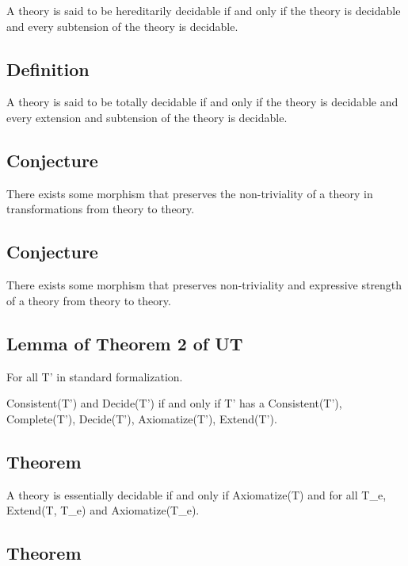 A theory is said to be hereditarily decidable if and only if the theory
is decidable and every subtension of the theory is decidable.

\hypertarget{definition-4}{%
\subsection{Definition}\label{definition-4}}

A theory is said to be totally decidable if and only if the theory is
decidable and every extension and subtension of the theory is decidable.

\hypertarget{conjecture}{%
\subsection{Conjecture}\label{conjecture}}

There exists some morphism that preserves the non-triviality of a theory
in transformations from theory to theory.

\hypertarget{conjecture-1}{%
\subsection{Conjecture}\label{conjecture-1}}

There exists some morphism that preserves non-triviality and expressive
strength of a theory from theory to theory.

\hypertarget{lemma-of-theorem-2-of-ut}{%
\subsection{Lemma of Theorem 2 of UT}\label{lemma-of-theorem-2-of-ut}}

For all T' in standard formalization.

Consistent(T') and Decide(T') if and only if T' has a Consistent(T'),
Complete(T'), Decide(T'), Axiomatize(T'), Extend(T').

\hypertarget{theorem-5}{%
\subsection{Theorem}\label{theorem-5}}

A theory is essentially decidable if and only if Axiomatize(T) and for
all T\_e, Extend(T, T\_e) and Axiomatize(T\_e).

\hypertarget{theorem-6}{%
\subsection{Theorem}\label{theorem-6}}

